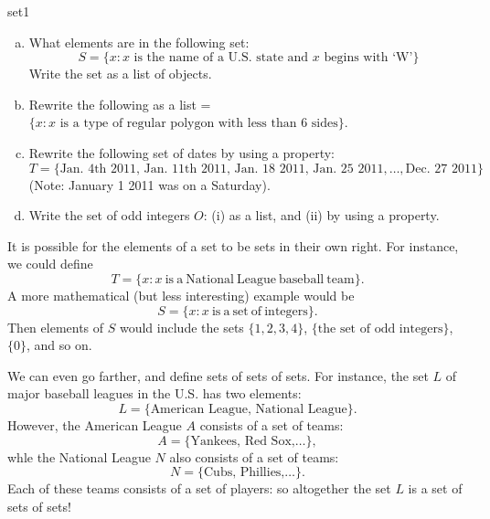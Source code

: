 \begin{exercise}{set1}
\begin{enumerate}[(a)]
\item
What elements are in the following set:  
$$S = \{x : x  \textrm{ is the name of a U.S. state and } x  \textrm{ begins with `W'} \}$$  
Write the set as a list of objects.
\item
Rewrite the following as a list =$\{x : x \textrm{ is a type of regular polygon with less than 6 sides} \}$.
\item
Rewrite the following set of dates by using a property:  
$$T = \{ \textrm{Jan. 4th  2011, Jan. 11th  2011, Jan. 18  2011, Jan. 25  2011}, \ldots, \textrm{Dec. 27 2011} \}$$ 
(Note: January 1 2011 was on a Saturday).
\item
Write the set of odd integers $O$: (i) as a list, and (ii) by using a property.
\end{enumerate}
\end{exercise}

It is possible for the elements of a set to be sets in their own right. For instance,  we could define
\[T = \{ x : x \mathrm{~is~a~National~League~baseball~team} \}. \]
A more mathematical (but less interesting) example would be
\[S = \{ x : x \mathrm{~is~a~set~of~integers} \}. \]
Then elements of $S$ would include the sets $\{1,2,3,4\}$, $\{\textrm{the set of odd integers}\}$, $\{ 0 \}$, and so on. 

We can even go farther, and define sets of sets of sets. For instance, the set $L$ of major baseball leagues in the U.S. has two elements: 
\[L = \{ \text{American League, National League} \}. \]
However, the American League $A$ consists of a set of teams:
\[A = \{ \text{Yankees, Red Sox,} \ldots \}, \]
whle the National League $N$ also consists of a set of teams:
\[N = \{ \text{Cubs, Phillies,} \ldots \}. \]
Each of these teams consists of a set of players: so altogether the set $L$ is a set of sets of sets!

